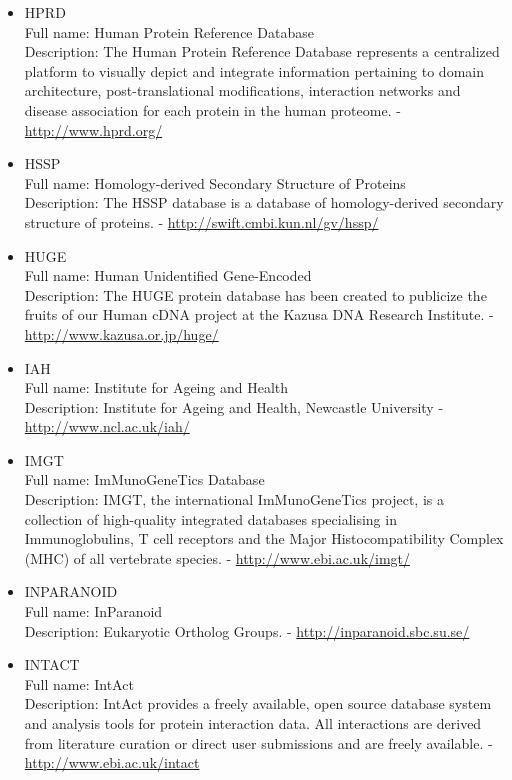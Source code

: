 \begin{itemize}
\item{HPRD}\\ Full name: Human Protein Reference Database\\ Description: The Human Protein Reference Database represents a centralized platform to visually depict and integrate information pertaining to domain architecture, post-translational modifications, interaction networks and disease association for each protein in the human proteome. - 
\url{http://www.hprd.org/}

\item{HSSP}\\ Full name: Homology-derived Secondary Structure of Proteins\\ Description: The HSSP database is a database of homology-derived secondary structure of proteins. - 
\url{http://swift.cmbi.kun.nl/gv/hssp/}

\item{HUGE}\\ Full name: Human Unidentified Gene-Encoded\\ Description: The HUGE protein database has been created to publicize the fruits of our Human cDNA project at the Kazusa DNA Research Institute. - 
\url{http://www.kazusa.or.jp/huge/}

\item{IAH}\\ Full name: Institute for Ageing and Health\\ Description: Institute for Ageing and Health, Newcastle University - 
\url{http://www.ncl.ac.uk/iah/}

\item{IMGT}\\ Full name: ImMunoGeneTics Database\\ Description: IMGT, the international ImMunoGeneTics project, is a collection of high-quality integrated databases specialising in Immunoglobulins, T cell receptors and the Major Histocompatibility Complex (MHC) of all vertebrate species. - 
\url{http://www.ebi.ac.uk/imgt/}

\item{INPARANOID}\\ Full name: InParanoid\\ Description: Eukaryotic Ortholog Groups. - 
\url{http://inparanoid.sbc.su.se/}

\item{INTACT}\\ Full name: IntAct\\ Description: IntAct provides a freely available, open source database system and analysis tools for protein interaction data. All interactions are derived from literature curation or direct user submissions and are freely available. - 
\url{http://www.ebi.ac.uk/intact}


\end{itemize}

